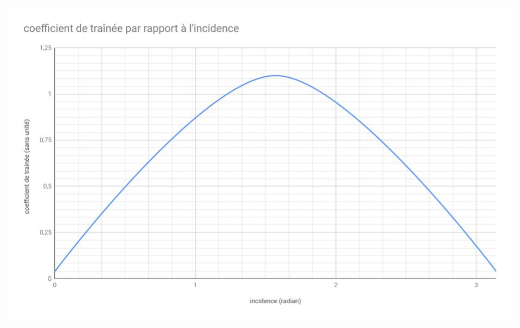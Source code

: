 \documentclass[a4paper,11pt]{article}
\begin{document}
\begin{appendix}
        \begin{center}
            \includegraphics[scale=0.7, angle=90]{assets/Rudder_Cx.jpg}
        \end{center}

    \end{appendix}
\end{document}
